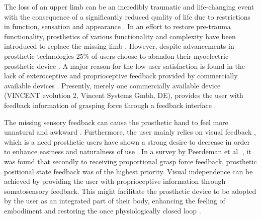 

The loss of an upper limb can be an incredibly traumatic and life-changing event with the consequence of a significantly reduced quality of life due to restrictions in function, sensation and appearance \cite{Schofield2014,Ostlie2011}. 
In an effort to restore pre-trauma functionality, prosthetics of various functionality and complexity have been introduced to replace the missing limb \cite{Geethanjali2016}. However, despite advancements in prosthetic technologies 25\% of users choose to abandon their myoelectric prosthetic device \cite{Biddiss2007a}. A major reason for the low user satisfaction is found in the lack of exteroceptive and proprioceptive feedback provided by commercially available devices \cite{Schofield2014,Peerdeman2011}. Presently, merely one commercially available device (VINCENT evolution 2, Vincent Systems Gmbh, DE), provides the user with feedback information of grasping force through a feedback interface \cite{Systems2005}. 
    
%
The missing sensory feedback can cause the prosthetic hand to feel more unnatural and awkward \cite{Pamungkas2015}. Furthermore, the user mainly relies on visual feedback \cite{Pamungkas2015,Stephens-Fripp2018}, which is a need prosthetic users have shown a strong desire to decrease in order to enhance easiness and naturalness of use \cite{Atkins1996}.
In a survey by Peerdeman et al. \cite{Peerdeman2011}, it was found that secondly to receiving proportional grasp force feedback, prosthetic positional state feedback was of the highest priority. Visual independence can be achieved by providing the user with proprioceptive information through somatosensory feedback. This might facilitate the prosthetic device to be adopted by the user as an integrated part of their body, enhancing the feeling of embodiment and restoring the once physiologically closed loop \cite{Stephens-Fripp2018,Xu2016,Strbac2016,Geng2012}. 

